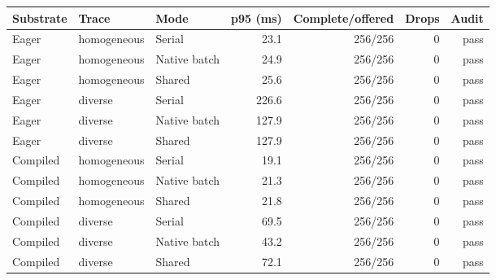 \begin{tabular}{lllrrrr}
\toprule
Substrate & Trace & Mode & p95 (ms) & Complete/offered & Drops & Audit \\
\midrule
Eager & homogeneous & Serial & 23.1 & 256/256 & 0 & pass \\
Eager & homogeneous & Native batch & 24.9 & 256/256 & 0 & pass \\
Eager & homogeneous & Shared & 25.6 & 256/256 & 0 & pass \\
Eager & diverse & Serial & 226.6 & 256/256 & 0 & pass \\
Eager & diverse & Native batch & 127.9 & 256/256 & 0 & pass \\
Eager & diverse & Shared & 127.9 & 256/256 & 0 & pass \\
Compiled & homogeneous & Serial & 19.1 & 256/256 & 0 & pass \\
Compiled & homogeneous & Native batch & 21.3 & 256/256 & 0 & pass \\
Compiled & homogeneous & Shared & 21.8 & 256/256 & 0 & pass \\
Compiled & diverse & Serial & 69.5 & 256/256 & 0 & pass \\
Compiled & diverse & Native batch & 43.2 & 256/256 & 0 & pass \\
Compiled & diverse & Shared & 72.1 & 256/256 & 0 & pass \\
\bottomrule
\end{tabular}
